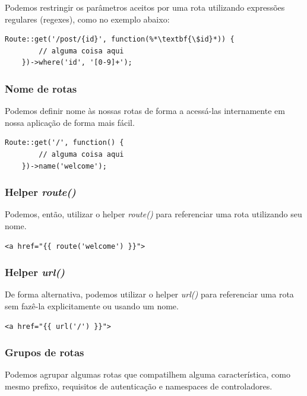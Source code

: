 \documentclass[
12pt,				%
openany,			%
twoside,			%
a4paper,			%
english,			%
french,				%
spanish,			%
brazil,				%
]{abntex2}
\begin{document}
Podemos restringir os parâmetros aceitos por uma rota utilizando expressões regulares (regexes), como no exemplo abaixo:

\begin{lstlisting}[style=php,caption={\textit{/routes/web.php 4}}]
    Route::get('/post/{id}', function(%*\textbf{\$id}*)) {
        // alguma coisa aqui
    })->where('id', '[0-9]+');
\end{lstlisting}

\subsubsection{Nome de rotas}

Podemos definir nome às nossas rotas de forma a acessá-las internamente em nossa aplicação de forma mais fácil.

\begin{lstlisting}[style=php,caption={\textit{/routes/web.php 5}}]
    Route::get('/', function() {
        // alguma coisa aqui
    })->name('welcome');
\end{lstlisting}

\subsubsection{Helper \textit{route()}}

Podemos, então, utilizar o helper \textit{route()} para referenciar uma rota utilizando seu nome.

\begin{lstlisting}[style=php,caption={Helper \textit{route()}}]
    <a href="{{ route('welcome') }}">
\end{lstlisting}

\subsubsection{Helper \textit{url()}}

De forma alternativa, podemos utilizar o helper \textit{url()} para referenciar uma rota sem fazê-la explicitamente ou usando um nome.

\begin{lstlisting}[style=php,caption={Helper \textit{url()}}]
    <a href="{{ url('/') }}">
\end{lstlisting}

\subsubsection{Grupos de rotas}
Podemos agrupar algumas rotas que compatilhem alguma característica, como
mesmo prefixo, requisitos de autenticação e namespaces de controladores.
\end{document}

